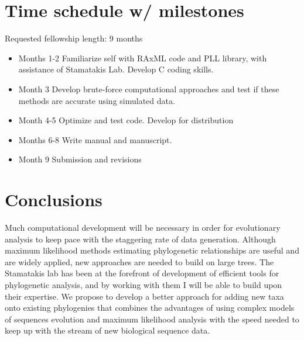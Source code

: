 \documentclass[10pt]{article}
\begin{document}
         
\section*{Time schedule w/ milestones}
   Requested fellowship length: 9 months
 
\begin{itemize}
  \item{Months 1-2} Familiarize self with RAxML code and PLL library, with assistance of Stamatakis Lab. 
Develop C coding skills.
  \item{Month 3} Develop brute-force computational approaches and test if these methods are accurate using simulated data.
  \item{Month 4-5} Optimize and test code. Develop for distribution 
  \item{Months 6-8} Write manual and manuscript.
  \item{Month 9} Submission and revisions
\end{itemize}


\section*{Conclusions}
Much computational development will be necessary in order for evolutionary analysis to keep pace with the staggering rate of data generation. 
Although maximum likelihood methods estimating phylogenetic relationships are useful and are widely applied, new approaches are needed to build on large trees. 
The Stamatakis lab has been at the forefront of development of efficient tools for phylogenetic analysis, and by working with them I will be able to build upon their expertise. 
We propose to develop a better approach for adding new taxa onto existing phylogenies that combines the advantages of using complex models of sequences evolution and maximum likelihood analysis with the speed needed to keep up with the stream of new biological sequence data. 



\end{document}
